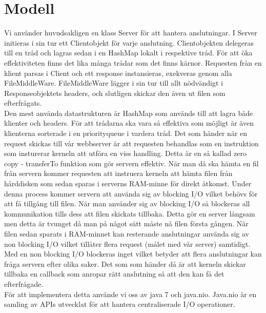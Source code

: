 \section{Modell}
Vi använder huvudsakligen en klass Server för att hantera anslutningar. I Server initieras i sin tur ett Clientobjekt för varje anslutning. Clientobjekten delegeras till en tråd och lagras sedan i en HashMap lokalt i respektive tråd.  För att öka effektiviteten finns det lika många trådar som det finns kärnor. Requesten från en klient parsas i Client och ett response instansieras, exekveras genom alla FileMiddleWare. FileMiddleWare lägger i sin tur till allt nödvändigt i Responseobjektets headers, och slutligen skickar den även ut filen som efterfrågats. \\
Den mest använda datastrukturen är HashMap som används till att lagra både klienter och headers. För att trådarna ska vara så effektiva som möjligt är även klienterna sorterade i en priorityqueue i vardera tråd.
Det som händer när en request skickas till vår webbserver är att requesten behandlas som en instruktion som insturerar kerneln att utföra en viss handling. Detta är en så kallad zero copy - transferTo funktion som gör servern effektiv. När man då ska hämta en fil från servern kommer requesten att instruera kerneln att hämta filen från hårddisken som sedan sparas i serverns RAM-minne för direkt åtkomst. Under denna process kommer servern att använda sig av blocking I/O vilket behövs för att få tillgång till filen. När man använder sig av blocking I/O så blockeras all kommunikation tills dess att filen skickats tillbaka.
Detta gör en server långsam men detta är tvunget då man på något sätt måste nå filen första gången. När filen sedan sparats i RAM-minnet kan resterande anslutningar använda sig av non blocking I/O vilket tillåter flera request (målet med vår server) samtidigt. Med en non blocking I/O blockeras inget vilket betyder att flera anslutningar kan fråga servern efter olika saker. Det som som händer då är att kerneln skickar tillbaka en callback som anropar rätt anslutning så att den kan få det efterfrågade.\\
För att implementera detta använde vi oss av java 7 och java.nio. Java.nio är en samling av APIs utvecklat för att hantera centraliserade I/O operationer. 

